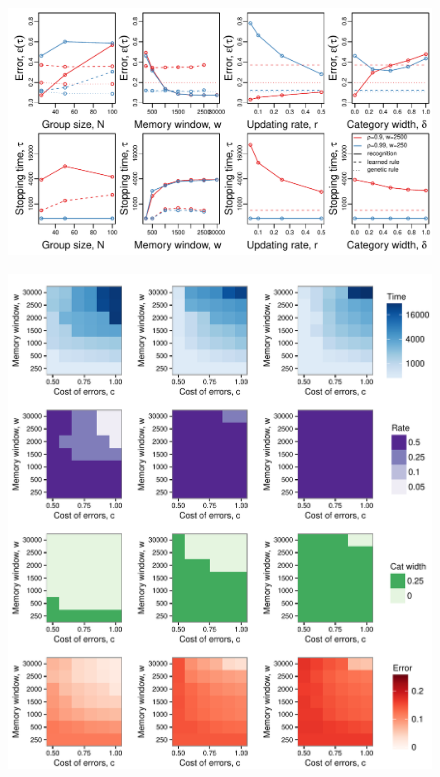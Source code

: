 \begin{figure}
\includegraphics[width=6.85in]{figures/parameters_exploration.pdf}
\caption{}
\end{figure}


\begin{figure}
\includegraphics[width=6.85in]{figures/strategies_heat_maps.pdf}
\caption{}
\end{figure}

